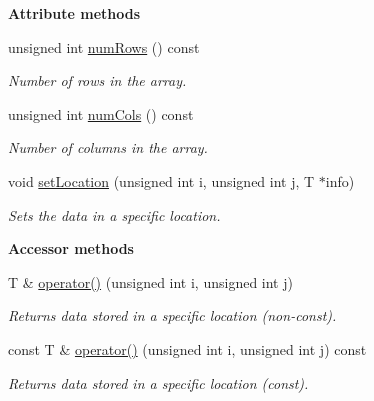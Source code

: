 \begin{Indent}{\bf Attribute methods}\par
\begin{DoxyCompactItemize}
\item 
unsigned int \hyperlink{class_q_u_e_s_o_1_1_two_d_array_a0c81a74def0364a5ddd3e1371ca48b39}{num\-Rows} () const 
\begin{DoxyCompactList}\small\item\em Number of rows in the array. \end{DoxyCompactList}\item 
unsigned int \hyperlink{class_q_u_e_s_o_1_1_two_d_array_aac40245b6f6a944d62a34d44324af5b2}{num\-Cols} () const 
\begin{DoxyCompactList}\small\item\em Number of columns in the array. \end{DoxyCompactList}\item 
void \hyperlink{class_q_u_e_s_o_1_1_two_d_array_aa204b1795ea5ba9d5583b6eec598b16e}{set\-Location} (unsigned int i, unsigned int j, T $\ast$info)
\begin{DoxyCompactList}\small\item\em Sets the data in a specific location. \end{DoxyCompactList}\end{DoxyCompactItemize}
\end{Indent}
\begin{Indent}{\bf Accessor methods}\par
\begin{DoxyCompactItemize}
\item 
T \& \hyperlink{class_q_u_e_s_o_1_1_two_d_array_a8cf6ad7a5890835d44740aa056fc9933}{operator()} (unsigned int i, unsigned int j)
\begin{DoxyCompactList}\small\item\em Returns data stored in a specific location (non-\/const). \end{DoxyCompactList}\item 
const T \& \hyperlink{class_q_u_e_s_o_1_1_two_d_array_a6195a83c1f1ed39349779e19421ef4bc}{operator()} (unsigned int i, unsigned int j) const 
\begin{DoxyCompactList}\small\item\em Returns data stored in a specific location (const). \end{DoxyCompactList}\end{DoxyCompactItemize}
\end{Indent}
